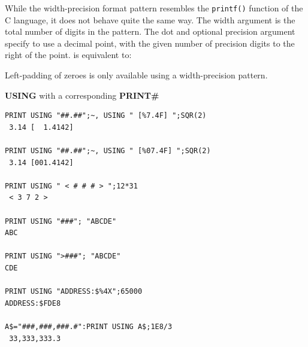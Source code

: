 \begin{description}[leftmargin=2cm,style=nextline]
                While the width-precision format pattern resembles the \texttt{printf()} function of the C language, it does not behave quite the same way. The width argument is the total number of digits in the pattern. The dot and optional precision argument specify to use a decimal point, with the given number of precision digits to the right of the point.  is equivalent to: 

                Left-padding of zeroes is only available using a width-precision pattern.

\newpage
\item [Example:] {\bf USING} with a corresponding {\bf PRINT\#}

\begin{tcolorbox}[colback=black,coltext=white]
\verbatimfont{\codefont}
\begin{verbatim}
PRINT USING "##.##";~, USING " [%7.4F] ";SQR(2)
 3.14 [  1.4142]

PRINT USING "##.##";~, USING " [%07.4F] ";SQR(2)
 3.14 [001.4142]

PRINT USING " < # # # > ";12*31
 < 3 7 2 >

PRINT USING "###"; "ABCDE"
ABC

PRINT USING ">###"; "ABCDE"
CDE

PRINT USING "ADDRESS:$%4X";65000
ADDRESS:$FDE8

A$="###,###,###.#":PRINT USING A$;1E8/3
 33,333,333.3
\end{verbatim}
\end{tcolorbox}
\end{description}


\newpage
